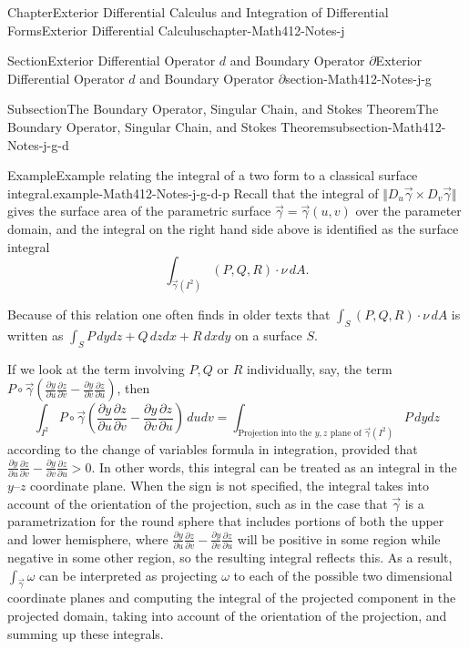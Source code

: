 \documentclass[oneside,10pt,]{book}
\numberwithin{equation}{section}
\newcommand{\vg}{{\vec{\gamma}}}
\begin{document}
\begin{chapterptx}{Chapter}{Exterior Differential Calculus and Integration of Differential Forms}{}{Exterior Differential Calculus}{}{}{chapter-Math412-Notes-j}
\begin{sectionptx}{Section}{Exterior Differential Operator \(d\) and Boundary Operator \(\partial\)}{}{Exterior Differential Operator \(d\) and Boundary Operator \(\partial\)}{}{}{section-Math412-Notes-j-g}
\begin{subsectionptx}{Subsection}{The Boundary Operator, Singular Chain, and Stokes Theorem}{}{The Boundary Operator, Singular Chain, and Stokes Theorem}{}{}{subsection-Math412-Notes-j-g-d}
\begin{example}{Example}{Example relating the integral of a two form to a classical surface integral.}{example-Math412-Notes-j-g-d-p}
Recall that the integral of \(\Vert D_{u}\vg\times D_{v}\vg\Vert\) gives the surface area of the parametric surface \(\vg=\vg(u, v)\) over the parameter domain, and the integral on the right hand side above is identified as the surface integral%
\begin{equation*}
\int_{\vg(I^{2})} (P, Q, R)\cdot \nu \, dA.
\end{equation*}
%
\par
Because of this relation one often finds in older texts that \(\int_{S} (P, Q, R)\cdot \nu \, dA\) is written as \(\int_{S} P\, dy dz + Q\, dz dx +R\,  dx dy\) on a surface \(S\).%
\par
If we look at the term involving \(P, Q\) or \(R\) individually, say, the term \(P\circ \vg \left(\frac{\partial y}{\partial u} \frac{\partial z}{\partial v}- 
\frac{\partial y}{\partial v} \frac{\partial z}{\partial u}  \right)\), then%
\begin{equation*}
\int_{I^{2}} P\circ \vg \left(\frac{\partial y}{\partial u} \frac{\partial z}{\partial v}- 
\frac{\partial y}{\partial v} \frac{\partial z}{\partial u}  \right) \, du dv
=\int_{\text{Projection into the } y, z 
\text{ plane of } \vg(I^{2})} P \,dy dz
\end{equation*}
according to the change of variables formula in integration, provided that \(\frac{\partial y}{\partial u} \frac{\partial z}{\partial v}- 
\frac{\partial y}{\partial v} \frac{\partial z}{\partial u}>0\). In other words, this integral can be treated as an integral in the \(y\mbox{--}z\) coordinate plane. When the sign is not specified, the integral takes into account of the orientation of the projection, such as in the case that \(\vg\) is a parametrization for the round sphere that includes portions of both the upper and lower hemisphere, where \(\frac{\partial y}{\partial u} \frac{\partial z}{\partial v}- 
\frac{\partial y}{\partial v} \frac{\partial z}{\partial u}\) will be positive in some region while negative in some other region,  so the resulting integral reflects this. As a result, \(\int_{\vg}\omega\) can be interpreted as projecting \(\omega\) to each of the possible two dimensional coordinate planes and computing the integral of the projected component in the projected domain, taking into account of the orientation of the projection, and summing up these integrals.%
\par

\end{example}
\end{subsectionptx}
\end{sectionptx}
\end{chapterptx}
\end{document}
